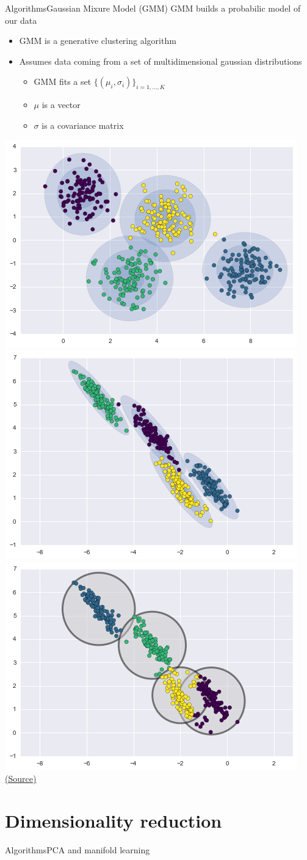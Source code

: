 \documentclass[10pt,compress]{beamer} %
\begin{document}
\begin{frame}{Algorithms}{Gaussian Mixure Model (GMM)}
	GMM builds a probabilic model of our data
	\begin{itemize}
		\item GMM is a generative clustering algorithm
		\item Assumes data coming from a set of multidimensional gaussian distributions
			\begin{itemize}
				\item GMM fits a set $\{(\mu_i, \sigma_i)\}_{i=1,\dots, K}$
				\item $\mu$ is a vector
				\item $\sigma$ is a covariance matrix
			\end{itemize}
	\end{itemize}

	\bigskip
	\centering \includegraphics[width=0.31\linewidth]{figs/gmm2.png}
	\includegraphics[width=0.31\linewidth]{figs/gmm3.png}
	\centering\includegraphics[width=0.31\linewidth]{figs/gmm1.png}\\
	\scriptsize\href{https://jakevdp.github.io/PythonDataScienceHandbook/05.12-gaussian-mixtures.html}{(Source)}
\end{frame}

\section{Dimensionality reduction}
{
\sectionheaderWhite %
\begin{frame}{Algorithms}{PCA and manifold learning}
\end{frame}
}
\end{document}
